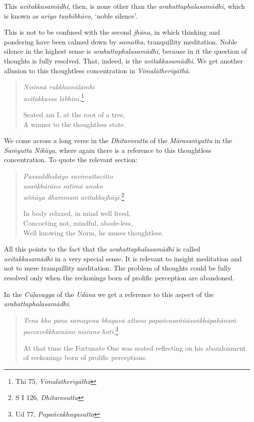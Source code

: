 This \emph{avitakkasamādhi}, then, is none other than the \emph{arahattaphalasamādhi}, which is known as \emph{ariyo tuṇhībhāvo}, `noble silence'.

This is not to be confused with the second \emph{jhāna}, in which thinking and pondering have been calmed down by \emph{samatha}, tranquillity meditation. Noble silence in the highest sense is \emph{arahattaphalasamādhi}, because in it the question of thoughts is fully resolved. That, indeed, is the \emph{avitakkasamādhi}. We get another allusion to this thoughtless concentration in \emph{Vimalātherīgāthā}.

\begin{quote}
\emph{Nisinnā rukkhamūlamhi}\\
\emph{avitakkassa lābhinī.}\footnote{Thī 75, \emph{Vimalātherīgāthā}}

Seated am I, at the root of a tree,\\
A winner to the thoughtless state.
\end{quote}

We come across a long verse in the \emph{Dhītarosutta} of the \emph{Mārasaṁyutta} in the \emph{Saṁyutta Nikāya}, where again there is a reference to this thoughtless concentration. To quote the relevant section:

\begin{quote}
\emph{Passaddhakāyo suvimuttacitto}\\
\emph{asaṅkhārāno satimā anoko}\\
\emph{aññāya dhammaṁ avitakkajhāyī.}\footnote{S I 126, \emph{Dhītarosutta}}

In body relaxed, in mind well freed,\\
Concocting not, mindful, abode-less,\\
Well knowing the Norm, he muses thoughtless.
\end{quote}

All this points to the fact that the \emph{arahattaphalasamādhi} is called \emph{avitakkasamādhi} in a very special sense. It is relevant to insight meditation and not to mere tranquillity meditation. The problem of thoughts could be fully resolved only when the reckonings born of prolific perception are abandoned.

In the \emph{Cūḷavagga} of the \emph{Udāna} we get a reference to this aspect of the \emph{arahattaphalasamādhi}.

\begin{quote}
\emph{Tena kho pana samayena bhagavā attano papañcasaññāsaṅkhāpahānaṁ paccavekkhamāno nisinno hoti.}\footnote{Ud 77, \emph{Papañcakhayasutta}}

At that time the Fortunate One was seated reflecting on his abandonment of reckonings born of prolific perceptions.
\end{quote}

